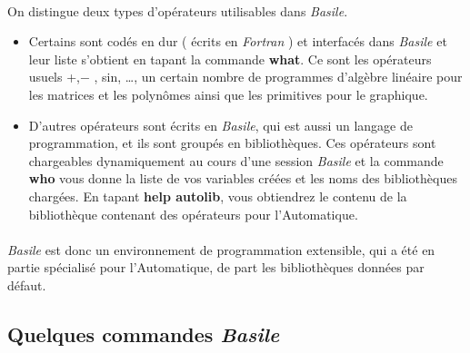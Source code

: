 \paragraph{}On distingue deux types d'op\'erateurs utilisables dans 
{\em Basile}.
\begin{itemize}
\item
 Certains sont cod\'es en dur ( \'ecrits en {\em Fortran} ) et interfac\'es 
 dans {\em Basile}  
et leur liste s'obtient en tapant la commande {\bf what}. Ce
 sont les op\'erateurs usuels +,$-$ , sin, \ldots, un certain nombre de 
programmes d'alg\`ebre lin\'eaire pour les matrices et les polyn\^omes
ainsi que les primitives pour le graphique. 
\item D'autres op\'erateurs sont \'ecrits en {\em Basile}, qui est aussi
 un langage de programmation, et ils sont group\'es en biblioth\`eques.
 Ces op\'erateurs sont 
 chargeables dynamiquement au cours d'une session {\em Basile} et la commande 
 {\bf who} vous donne la liste de vos variables cr\'e\'ees et les noms des 
 biblioth\`eques charg\'ees. En tapant {\bf help autolib}, vous obtiendrez le 
 contenu de la biblioth\`eque contenant des op\'erateurs pour l'Automatique.
\end{itemize}

\paragraph{}{\em Basile} est donc un environnement de programmation 
extensible,  qui a \'et\'e en partie sp\'ecialis\'e pour l'Automatique, de 
part les biblioth\`eques  donn\'ees par d\'efaut.

\subsection{Quelques commandes {\em Basile}}


